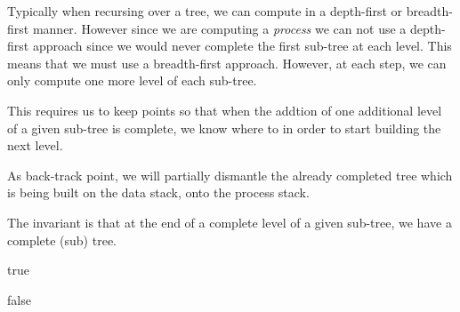 Typically when recursing over a tree, we can compute in a depth-first or 
breadth-first manner. However since we are computing a \emph{process} we 
can not use a depth-first approach since we would never complete the first 
sub-tree at each level. This means that we must use a breadth-first 
approach. However, at each step, we can only compute one more level of 
each sub-tree. 

This requires us to keep  points so that when the 
addtion of one additional level of a given sub-tree is complete, we know 
where to  in order to start building the next level. 

As back-track point, we will partially dismantle the already completed 
tree which is being built on the data stack, onto the process stack. 

The invariant is that at the end of a complete level of a given sub-tree, 
we have a complete (sub) tree. 

\starttyping
\startJoylolCode

\startPrecondition
true
\stopPrecondition




\startPostcondition
false
\stopPostcondition

\stopJoylolCode
\stoptyping